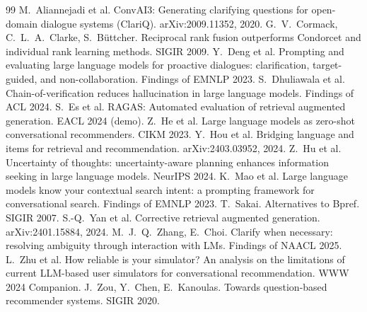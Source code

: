 \documentclass[10pt,a4paper,twocolumn]{article}
\begin{document}
\footnotesize
\begin{thebibliography}{99}\setlength{\itemsep}{0pt}
 M.~Aliannejadi et al. ConvAI3: Generating clarifying questions for open-domain dialogue systems (ClariQ). arXiv:2009.11352, 2020.
 G.~V.~Cormack, C.~L.~A.~Clarke, S.~Büttcher. Reciprocal rank fusion outperforms Condorcet and individual rank learning methods. SIGIR 2009.
 Y.~Deng et al. Prompting and evaluating large language models for proactive dialogues: clarification, target-guided, and non-collaboration. Findings of EMNLP 2023.
 S.~Dhuliawala et al. Chain-of-verification reduces hallucination in large language models. Findings of ACL 2024.
 S.~Es et al. RAGAS: Automated evaluation of retrieval augmented generation. EACL 2024 (demo).
 Z.~He et al. Large language models as zero-shot conversational recommenders. CIKM 2023.
 Y.~Hou et al. Bridging language and items for retrieval and recommendation. arXiv:2403.03952, 2024.
 Z.~Hu et al. Uncertainty of thoughts: uncertainty-aware planning enhances information seeking in large language models. NeurIPS 2024.
 K.~Mao et al. Large language models know your contextual search intent: a prompting framework for conversational search. Findings of EMNLP 2023.
 T.~Sakai. Alternatives to Bpref. SIGIR 2007.
 S.-Q.~Yan et al. Corrective retrieval augmented generation. arXiv:2401.15884, 2024.
 M.~J.~Q.~Zhang, E.~Choi. Clarify when necessary: resolving ambiguity through interaction with LMs. Findings of NAACL 2025.
 L.~Zhu et al. How reliable is your simulator? An analysis on the limitations of current LLM-based user simulators for conversational recommendation. WWW 2024 Companion.
 J.~Zou, Y.~Chen, E.~Kanoulas. Towards question-based recommender systems. SIGIR 2020.
\end{thebibliography}
\end{document}
